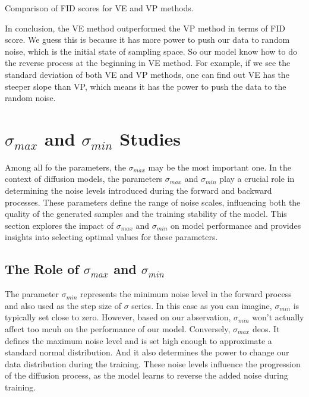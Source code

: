 \begin{table}[h!]
    \centering
    \caption{Comparison of FID scores for VE and VP methods.}
\end{table}

In conclusion, the VE method outperformed the VP method in terms of FID score. 
We guess this is because it has more power to push our data to random noise, which is the initial state of sampling space. So our model know how to do the reverse process at the beginning in VE method. For example, if we see the standard deviation of both VE and VP methods, one can find out VE has the steeper slope than VP, which means it has the power to push the data to the random noise.

\section{$\sigma_{max}$ and $\sigma_{min}$ Studies}

Among all fo the parameters, the $\sigma_{max}$ may be the most important one. In the context of diffusion models, the parameters $\sigma_{max}$ and $\sigma_{min}$ play a crucial role in determining the noise levels introduced during the forward and backward processes. These parameters define the range of noise scales, influencing both the quality of the generated samples and the training stability of the model. This section explores the impact of $\sigma_{max}$ and $\sigma_{min}$ on model performance and provides insights into selecting optimal values for these parameters.

\subsection{The Role of $\sigma_{max}$ and $\sigma_{min}$}

The parameter $\sigma_{min}$ represents the minimum noise level in the forward process and also used as the step size of $\sigma$ series. In this case as you can imagine, $\sigma_{min}$ is typically set close to zero. However, based on our abservation, $\sigma_{min}$ won't actually affect too mcuh on the performance of our model. Conversely, $\sigma_{max}$ deos. It defines the maximum noise level and is set high enough to approximate a standard normal distribution. And it also determines the power to change our data distribution during the training. These noise levels influence the progression of the diffusion process, as the model learns to reverse the added noise during training.


